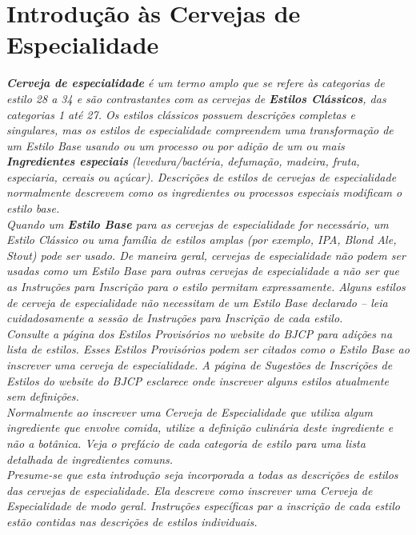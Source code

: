 \section*{Introdução às Cervejas de Especialidade}
\textit{\textbf{Cerveja de especialidade} é um termo amplo que se refere às categorias de estilo 28 a 34 e são contrastantes com as cervejas de \textbf{Estilos Clássicos}, das categorias 1 até 27. Os estilos clássicos possuem descrições completas e singulares, mas os estilos de especialidade compreendem uma transformação de um Estilo Base usando ou um processo ou por adição de um ou mais \textbf{Ingredientes especiais} (levedura/bactéria, defumação, madeira, fruta, especiaria, cereais ou açúcar). Descrições de estilos de cervejas de especialidade normalmente descrevem como os ingredientes ou processos especiais modificam o estilo base.}\\
\textit{Quando um \textbf{Estilo Base} para as cervejas de especialidade for necessário, um Estilo Clássico ou uma família de estilos amplas (por exemplo, IPA, Blond Ale, Stout) pode ser usado. De maneira geral, cervejas de especialidade não podem ser usadas como um Estilo Base para outras cervejas de especialidade a não ser que as Instruções para Inscrição para o estilo permitam expressamente. Alguns estilos de cerveja de especialidade não necessitam de um Estilo Base declarado – leia cuidadosamente a sessão de Instruções para Inscrição de cada estilo.}\\
\textit{Consulte a página dos Estilos Provisórios no website do BJCP para adições na lista de estilos. Esses Estilos Provisórios podem ser citados como o Estilo Base ao inscrever uma cerveja de especialidade. A página de Sugestões de Inscrições de Estilos do website do BJCP esclarece onde inscrever alguns estilos atualmente sem definições.}\\
\textit{Normalmente ao inscrever uma Cerveja de Especialidade que utiliza algum ingrediente que envolve comida, utilize a definição culinária deste ingrediente e não a botânica. Veja o prefácio de cada categoria de estilo para uma lista detalhada de ingredientes comuns. }\\
\textit{Presume-se que esta introdução seja incorporada a todas as descrições de estilos das cervejas de especialidade. Ela descreve como inscrever uma Cerveja de Especialidade de modo geral. Instruções específicas par a inscrição de cada estilo estão contidas nas descrições de estilos individuais.}\\